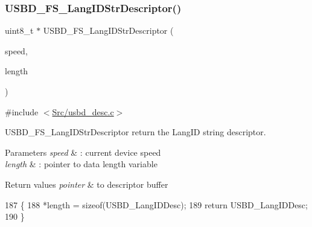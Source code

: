\subsubsection{\texorpdfstring{U\+S\+B\+D\+\_\+\+F\+S\+\_\+\+Lang\+I\+D\+Str\+Descriptor()}{USBD\_FS\_LangIDStrDescriptor()}}
{\footnotesize\ttfamily uint8\+\_\+t $\ast$ U\+S\+B\+D\+\_\+\+F\+S\+\_\+\+Lang\+I\+D\+Str\+Descriptor (\begin{DoxyParamCaption}\item[{U\+S\+B\+D\+\_\+\+Speed\+Type\+Def}]{speed,  }\item[{uint16\+\_\+t $\ast$}]{length }\end{DoxyParamCaption})}



{\ttfamily \#include $<$\mbox{\hyperlink{usbd__desc_8c}{Src/usbd\+\_\+desc.\+c}}$>$}



U\+S\+B\+D\+\_\+\+F\+S\+\_\+\+Lang\+I\+D\+Str\+Descriptor return the Lang\+ID string descriptor. 


\begin{DoxyParams}{Parameters}
{\em speed} & \+: current device speed \\
\hline
{\em length} & \+: pointer to data length variable \\
\hline
\end{DoxyParams}

\begin{DoxyRetVals}{Return values}
{\em pointer} & to descriptor buffer \\
\hline
\end{DoxyRetVals}

\begin{DoxyCode}
187 \{
188   *length =  \textcolor{keyword}{sizeof}(USBD\_LangIDDesc);  
189   \textcolor{keywordflow}{return} USBD\_LangIDDesc;
190 \}
\end{DoxyCode}
\mbox{\label{group___u_s_b_d___d_e_s_c___private___functions_ga6427a671827813efe1a46c3dfcb05683}} 
